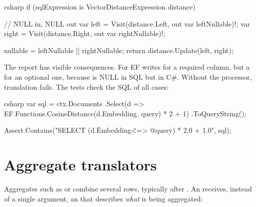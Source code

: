 \begin{sourcecode}{csharp}
if (sqlExpression is VectorDistanceExpression distance)
{
    // NULL in, NULL out
    var left = Visit(distance.Left, out var leftNullable)!;
    var right = Visit(distance.Right, out var rightNullable)!;

    nullable = leftNullable || rightNullable;
    return distance.Update(left, right);
}
\end{sourcecode}

The report has visible consequences. For
 EF writes  for a required column, but a  for an optional one,
because  is NULL in SQL but  in C\#. Without the
processor, translation fails. The tests check the SQL of all cases:

\begin{sourcecode}{csharp}
var sql = ctx.Documents
    .Select(d => EF.Functions.CosineDistance(d.Embedding, query) * 2 + 1)
    .ToQueryString();

Assert.Contains("SELECT (d.\"Embedding\" <=> @query) * 2.0 + 1.0", sql);
\end{sourcecode}

\chapter{Aggregate translators}\label{ch:aggregate-translators}

Aggregates such as  or  combine several rows,
typically after . An
 receives,
instead of a single argument, an  that describes
\emph{what} is being aggregated:

